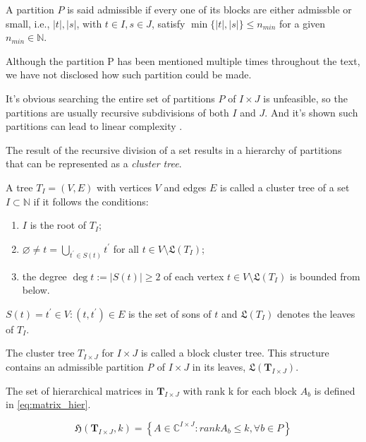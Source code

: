 A partition $P$ is said admissible if every one of its blocks are either admissble or small, i.e., $|t|, |s|$, with $t \in I, s \in J$, satisfy $\min\{|t|,|s| \} \leq n_{min}$ for a given $n_{min} \in \mathbb{N}$.

Although the partition P has been mentioned multiple times throughout the text, we have not disclosed how such partition could be made.

It's obvious searching the entire set of partitions $P$ of $I \times J$ is unfeasible, so the partitions are usually  recursive subdivisions of both $I$ and $J$. And it's shown such partitions can lead to linear complexity \cite{bebendorf2008hierarchical}.

The result of the recursive division of a set results in a hierarchy of partitions that can be represented as a \textit{cluster tree}.

A tree $T_{I} = (V,E)$ with vertices $V$ and edges $E$ is called a cluster tree of a set $I\subset \mathbb{N}$ if it follows the conditions:

\begin{enumerate}
    \item $I$ is the root of $T_{I}$;
    \item $\varnothing \neq t = \bigcup_{t^{'} \in S(t)} t^{'} $ for all $t \in V \setminus   \mathfrak{L}(T_{I}) $;
    \item the degree $\deg t := |S(t)| \geq 2$ of each vertex $t \in V \setminus \mathfrak{L}(T_{I})$ is bounded from below.
\end{enumerate}

$S(t)={t^{'} \in V : (t,t^{'})\in E}$ is the set of sons of $t$ and $\mathfrak{L}(T_{I})$ denotes the leaves of $T_{I}$.

The cluster tree $T_{I \times J}$ for $I \times J$ is called a block cluster tree. This structure contains an admissible partition \textit{P} of $ I \times J$ in its leaves, $\mathfrak{L}(\mathbf{T}_{I \times J})$.

The set of hierarchical matrices in $\mathbf{T}_{I \times J}$ with rank k for each block $A_{b}$ is defined in \ref{eq:matrix_hier}.

\begin{equation}\label{eq:matrix_hier}
    \mathfrak{H}(\mathbf{T}_{I \times J},k) = \left\{  A\in \mathbb{C}^{I\times J} : rankA_{b} \leq k, \forall b \in P \right\}
\end{equation}



